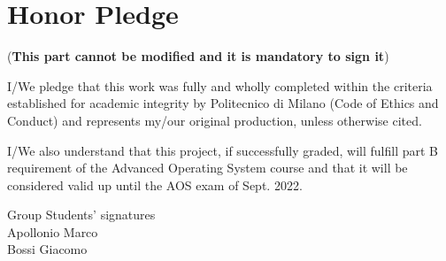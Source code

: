 \documentclass[10pt,a4]{article}
\begin{document}
\section{Honor Pledge}
 (\textbf{This part cannot be modified and it is mandatory to sign it})

I/We pledge that this work was fully and wholly completed within the criteria
established for academic integrity by Politecnico di Milano (Code of Ethics and
Conduct) and represents my/our original production, unless otherwise cited.

I/We also understand that this project, if successfully graded,  will fulfill part B requirement of the
Advanced Operating System course and that it will be considered valid up until
the AOS exam of Sept. 2022.

\begin{flushright}
  Group Students' signatures\\
  Apollonio Marco\\
  Bossi Giacomo
\end{flushright}
\end{document}
